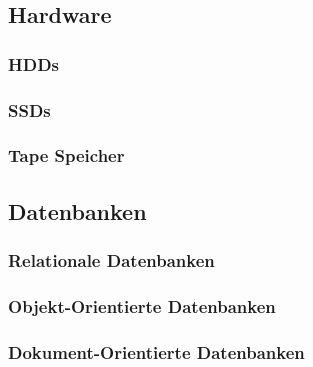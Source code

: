 \subsection{Hardware}

\subsubsection{HDDs}

\subsubsection{SSDs}

\subsubsection{Tape Speicher}

\subsection{Datenbanken}

\subsubsection{Relationale Datenbanken}

\subsubsection{Objekt-Orientierte Datenbanken}

\subsubsection{Dokument-Orientierte Datenbanken}



